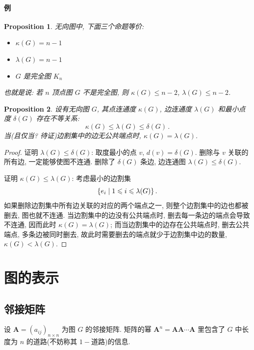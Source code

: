 \documentclass[UTF8]{ctexart}
\theoremstyle{mystyle}
\newtheorem{proposition}{Proposition}[section]
\theoremstyle{myremark}
\theoremstyle{plain}
\newcommand{\ve}[1]{\boldsymbol{\mathbf{#1}}}
\DeclarePairedDelimiter\set{\{}{\}}
\begin{document}
\paragraph{例}



\begin{proposition}
    无向图中, 下面三个命题等价:
    \begin{itemize}
        \item $ \kappa(G) = n - 1 $
        \item $ \lambda(G) = n - 1 $
        \item $ G $ 是完全图 $ K_n $
    \end{itemize}
    也就是说: 若 $ n $ 顶点图 $ G $ 不是完全图, 则 $ \kappa(G) \leqslant n - 2 $, $ \lambda(G) \leqslant n - 2 $.
\end{proposition}

\begin{proposition}
    设有无向图 $ G $, 其点连通度 $ \kappa(G) $, 边连通度 $ \lambda(G) $ 和最小点度 $ \delta(G) $ 存在不等关系:
    \[ \kappa(G) \leqslant \lambda(G) \leqslant \delta(G) \,.\] 
    当(且仅当? 待证)边割集中的边无公共端点时, $ \kappa(G) = \lambda(G) $.
\end{proposition}

\begin{proof}
    证明 $ \lambda(G) \leqslant \delta(G) $: 取度最小的点 $ v $, $ d(v) = \delta(G) $. 删除与 $ v $ 关联的所有边, 一定能够使图不连通. 删除了 $ \delta(G) $ 条边, 边连通图 $ \lambda(G) \leqslant \delta(G) $.

    证明 $ \kappa(G) \leqslant \lambda(G) $: 考虑最小的边割集 \[ \set{e_i \mid 1 \leqslant i \leqslant \lambda(G)} \,.\] 如果删除边割集中所有边关联的对应的两个端点之一, 则整个边割集中的边也都被删去, 图也就不连通. 当边割集中的边没有公共端点时, 删去每一条边的端点会导致不连通, 因而此时 $ \kappa(G) = \lambda(G) $; 而当边割集中的边存在公共端点时, 删去公共端点, 多条边被同时删去, 故此时需要删去的端点就少于边割集中边的数量, $ \kappa(G) < \lambda(G) $.
\end{proof}


\section{图的表示}
\subsection{邻接矩阵}
设 $ \ve A = (a_{ij})_{n \times n} $ 为图 $ G $ 的邻接矩阵. 矩阵的幂 $ \ve A^n = \ve A \ve A \cdots \ve A $ 里包含了 $ G $ 中长度为 $ n $ 的道路(不妨称其 $ 1- $道路)的信息.
\end{document}
